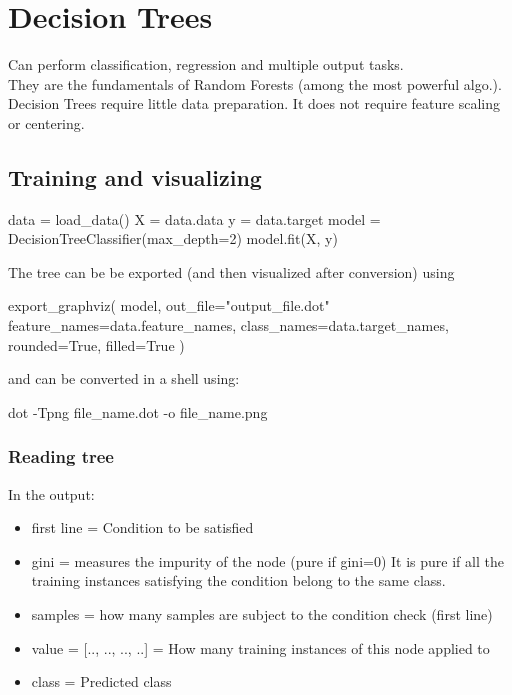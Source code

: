 \newpage
\section{Decision Trees}

    Can perform classification, regression and multiple output tasks.\\

    They are the fundamentals of Random Forests (among the most powerful algo.).\\

    Decision Trees require little data preparation.
    It does not require feature scaling or centering.\\

\subsection{Training and visualizing}

\begin{python}
    data = load_data()
    X = data.data
    y = data.target
    model = DecisionTreeClassifier(max_depth=2)
    model.fit(X, y)
\end{python}

The tree can be be exported (and then visualized after conversion) using
\begin{python}
    export_graphviz(
        model,
        out_file="output_file.dot"
        feature_names=data.feature_names,
        class_names=data.target_names,
        rounded=True,
        filled=True
    )
\end{python}
and can be converted in a shell using:
\begin{python}
    dot -Tpng file_name.dot -o file_name.png
\end{python}

\subsubsection*{Reading tree}
In the output:\\
\begin{itemize}
    \item first line = Condition to be satisfied
    \item gini = measures the impurity of the node (pure if gini=0)
            It is pure if all the training instances satisfying the condition belong to the same class.
    \item samples = how many samples are subject to the condition check (first line)
    \item value = [.., .., .., ..] = How many training instances of this node applied to
    \item class = Predicted class
\end{itemize}

